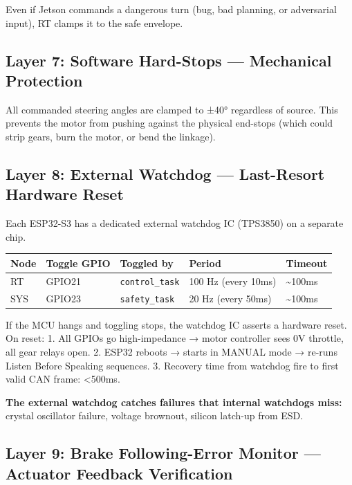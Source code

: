 \documentclass[12pt,a4paper,oneside]{report}
\begin{document}
Even if Jetson commands a dangerous turn (bug, bad planning, or adversarial
input), RT clamps it to the safe envelope.

\subsection{Layer 7: Software Hard-Stops --- Mechanical
Protection}\label{layer-7-software-hard-stops-mechanical-protection}

All commanded steering angles are clamped to ±40° regardless of source. This
prevents the motor from pushing against the physical end-stops (which could
strip gears, burn the motor, or bend the linkage).

\subsection{Layer 8: External Watchdog --- Last-Resort Hardware
Reset}\label{layer-8-external-watchdog-last-resort-hardware-reset}

Each ESP32-S3 has a dedicated external watchdog IC (TPS3850) on a separate chip.

\begin{longtable}[]{@{}lllll@{}}
\toprule\noalign{}
Node & Toggle GPIO & Toggled by & Period & Timeout \\
\midrule\noalign{}
\endhead
\bottomrule\noalign{}
\endlastfoot
RT & GPIO21 & \texttt{control\_task} & 100 Hz (every 10ms) &
\textasciitilde100ms \\
SYS & GPIO23 & \texttt{safety\_task} & 20 Hz (every 50ms) &
\textasciitilde100ms \\
\end{longtable}

If the MCU hangs and toggling stops, the watchdog IC asserts a hardware reset.
On reset: 1. All GPIOs go high-impedance → motor controller sees 0V throttle,
all gear relays open. 2. ESP32 reboots → starts in MANUAL mode → re-runs Listen
Before Speaking sequences. 3. Recovery time from watchdog fire to first valid
CAN frame: \textless500ms.

\textbf{The external watchdog catches failures that internal watchdogs miss:}
crystal oscillator failure, voltage brownout, silicon latch-up from ESD.

\subsection{Layer 9: Brake Following-Error Monitor --- Actuator Feedback
Verification}\label{layer-9-brake-following-error-monitor-actuator-feedback-verification}
\end{document}
